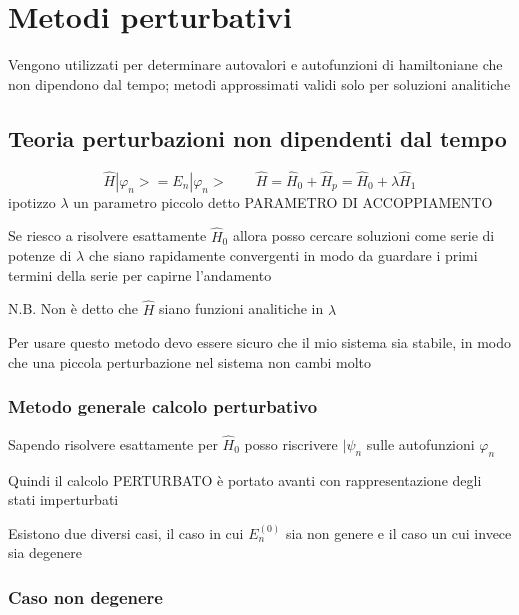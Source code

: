 \chapter{Metodi perturbativi}

Vengono utilizzati per determinare autovalori e autofunzioni di hamiltoniane che non dipendono dal tempo; metodi approssimati validi solo per soluzioni analitiche 

\section{Teoria perturbazioni non dipendenti dal tempo}

\begin{equation*}
    \hat{H} |\varphi_n> = E_n |\varphi_n> \qquad  \hat{H} = \hat{H}_0 + \hat{H}_p = \hat{H}_0 + \lambda \hat{H}_1
\end{equation*}
ipotizzo \(\lambda\) un parametro piccolo detto PARAMETRO DI ACCOPPIAMENTO

\noindent Se riesco a risolvere esattamente \(\hat{H}_0\) allora posso cercare soluzioni come serie di potenze di \(\lambda\) che siano rapidamente convergenti in modo da guardare i primi termini della serie per capirne l'andamento

\noindent N.B. \; Non è detto che \(\hat{H}\) siano funzioni analitiche in \(\lambda\)

\noindent Per usare questo metodo devo essere sicuro che il mio sistema sia stabile, in modo che una piccola perturbazione nel sistema non cambi molto

\subsection{Metodo generale calcolo perturbativo}

Sapendo risolvere esattamente per \(\hat{H}_0\) posso riscrivere \(|\psi_n\) sulle autofunzioni \(\varphi_n\)

\noindent Quindi il calcolo PERTURBATO è portato avanti con rappresentazione degli stati imperturbati

\noindent Esistono due diversi casi, il caso in cui \(E^{(0)}_n\) sia non genere e il caso un cui invece sia degenere

\subsection{Caso non degenere}


